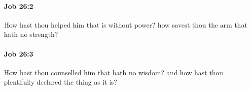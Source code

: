 		\paragraph{Job 26:2} %
			\label{JOB-26-2}

			How hast thou helped him that is without power? how savest thou the arm that hath no strength?


		\paragraph{Job 26:3} %
			\label{JOB-26-3}

			How hast thou counselled him that hath no wisdom? and how hast thou plentifully declared the thing as it is?


